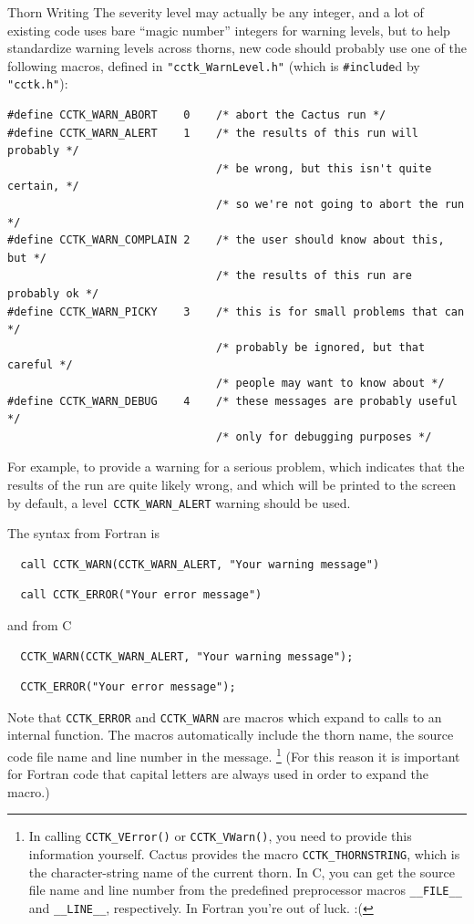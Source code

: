 \begin{cactuspart}{Thorn Writing}
The severity level may actually be any integer, and a lot of existing
code uses bare ``magic number'' integers for warning levels, but to
help standardize warning levels across thorns, new code should probably
use one of the following macros, defined in \verb|"cctk_WarnLevel.h"|
(which is \verb|#include|d by \verb|"cctk.h"|):
\begin{verbatim}
#define CCTK_WARN_ABORT    0    /* abort the Cactus run */
#define CCTK_WARN_ALERT    1    /* the results of this run will probably */
                                /* be wrong, but this isn't quite certain, */
                                /* so we're not going to abort the run */
#define CCTK_WARN_COMPLAIN 2    /* the user should know about this, but */
                                /* the results of this run are probably ok */
#define CCTK_WARN_PICKY    3    /* this is for small problems that can */
                                /* probably be ignored, but that careful */
                                /* people may want to know about */
#define CCTK_WARN_DEBUG    4    /* these messages are probably useful */
                                /* only for debugging purposes */
\end{verbatim}

For example, to provide a warning for a serious problem, which
indicates that the results of the run are quite likely wrong,
and which will be printed to the screen by default,
a level~\verb|CCTK_WARN_ALERT| warning should be used.

The syntax from Fortran is
\begin{verbatim}
  call CCTK_WARN(CCTK_WARN_ALERT, "Your warning message")
\end{verbatim}
\begin{verbatim}
  call CCTK_ERROR("Your error message")
\end{verbatim}

and from C
\begin{verbatim}
  CCTK_WARN(CCTK_WARN_ALERT, "Your warning message");
\end{verbatim}
\begin{verbatim}
  CCTK_ERROR("Your error message");
\end{verbatim}

Note that \texttt{CCTK\_ERROR} and \texttt{CCTK\_WARN} are macros
which expand to calls to an internal function. The macros
automatically include the thorn name, the source code file name and
line number in the message.%
\footnote{%
         In calling \texttt{CCTK\_VError()} or \texttt{CCTK\_VWarn()},
         you need to
         provide this information yourself.  Cactus
         provides the macro \texttt{CCTK\_THORNSTRING},
         which is the character-string name of the
         current thorn.  In C, you can get the source
         file name and line number from the predefined
         preprocessor macros \texttt{\_\_FILE\_\_} and
         \texttt{\_\_LINE\_\_}, respectively.  In Fortran
         you're out of luck. :(
         }%
{}  (For this reason it is important for Fortran code that capital
letters are always used in order to expand the macro.)


\end{cactuspart}
